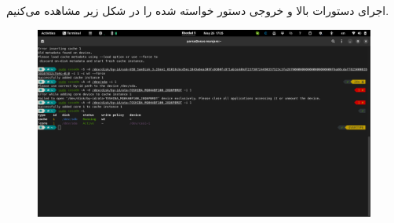 \documentclass{article}
\begin{document}
اجرای دستورات بالا و خروجی دستور خواسته شده را در شکل زیر مشاهده می‌کنیم.

\begin{figure}[H]
    \centering
    \includegraphics[width=\textwidth]{images/3-c-result.png}
\end{figure}
\end{document}
